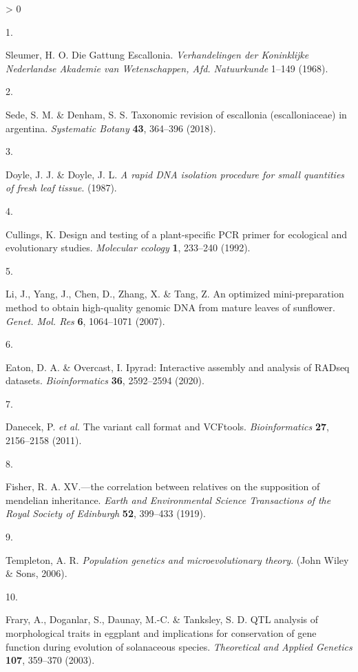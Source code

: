 \documentclass[
  11pt,
]{article}
\newlength{\cslhangindent}
\newlength{\csllabelwidth}
\newenvironment{CSLReferences}[2] %
 {%
  \setlength{\parindent}{0pt}
  \ifodd #1 \everypar{\setlength{\hangindent}{\cslhangindent}}\ignorespaces\fi
  \ifnum #2 > 0
  \setlength{\parskip}{#2\baselineskip}
  \fi
 }%
 {}
\newcommand{\CSLLeftMargin}[1]{\parbox[t]{\csllabelwidth}{#1}}
\newcommand{\CSLRightInline}[1]{\parbox[t]{\linewidth - \csllabelwidth}{#1}\break}
\begin{document}
\hypertarget{refs}{}
\begin{CSLReferences}{0}{0}
\leavevmode\hypertarget{ref-Sleumer:1968ts}{}%
\CSLLeftMargin{1. }
\CSLRightInline{Sleumer, H. O. {Die Gattung Escallonia}. \emph{Verhandelingen der Koninklijke Nederlandse Akademie van Wetenschappen, Afd. Natuurkunde} 1--149 (1968).}

\leavevmode\hypertarget{ref-sede2018taxonomic}{}%
\CSLLeftMargin{2. }
\CSLRightInline{Sede, S. M. \& Denham, S. S. Taxonomic revision of escallonia (escalloniaceae) in argentina. \emph{Systematic Botany} \textbf{43}, 364--396 (2018).}

\leavevmode\hypertarget{ref-doyle1987rapid}{}%
\CSLLeftMargin{3. }
\CSLRightInline{Doyle, J. J. \& Doyle, J. L. \emph{A rapid DNA isolation procedure for small quantities of fresh leaf tissue}. (1987).}

\leavevmode\hypertarget{ref-Cullings1992}{}%
\CSLLeftMargin{4. }
\CSLRightInline{Cullings, K. Design and testing of a plant-specific PCR primer for ecological and evolutionary studies. \emph{Molecular ecology} \textbf{1}, 233--240 (1992).}

\leavevmode\hypertarget{ref-li2007optimized}{}%
\CSLLeftMargin{5. }
\CSLRightInline{Li, J., Yang, J., Chen, D., Zhang, X. \& Tang, Z. An optimized mini-preparation method to obtain high-quality genomic DNA from mature leaves of sunflower. \emph{Genet. Mol. Res} \textbf{6}, 1064--1071 (2007).}

\leavevmode\hypertarget{ref-eaton2020ipyrad}{}%
\CSLLeftMargin{6. }
\CSLRightInline{Eaton, D. A. \& Overcast, I. Ipyrad: Interactive assembly and analysis of RADseq datasets. \emph{Bioinformatics} \textbf{36}, 2592--2594 (2020).}

\leavevmode\hypertarget{ref-danecek2011variant}{}%
\CSLLeftMargin{7. }
\CSLRightInline{Danecek, P. \emph{et al.} The variant call format and VCFtools. \emph{Bioinformatics} \textbf{27}, 2156--2158 (2011).}

\leavevmode\hypertarget{ref-fisher1919xv}{}%
\CSLLeftMargin{8. }
\CSLRightInline{Fisher, R. A. XV.---the correlation between relatives on the supposition of mendelian inheritance. \emph{Earth and Environmental Science Transactions of the Royal Society of Edinburgh} \textbf{52}, 399--433 (1919).}

\leavevmode\hypertarget{ref-templeton2006population}{}%
\CSLLeftMargin{9. }
\CSLRightInline{Templeton, A. R. \emph{Population genetics and microevolutionary theory}. (John Wiley \& Sons, 2006).}

\leavevmode\hypertarget{ref-frary2003qtl}{}%
\CSLLeftMargin{10. }
\CSLRightInline{Frary, A., Doganlar, S., Daunay, M.-C. \& Tanksley, S. D. QTL analysis of morphological traits in eggplant and implications for conservation of gene function during evolution of solanaceous species. \emph{Theoretical and Applied Genetics} \textbf{107}, 359--370 (2003).}


\end{CSLReferences}
\end{document}
